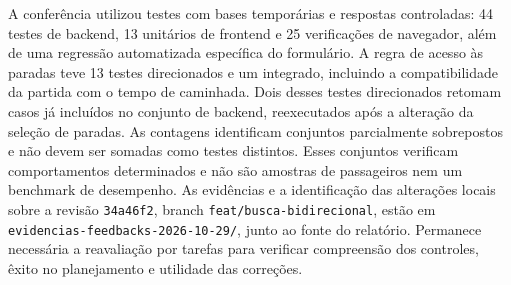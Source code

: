 A conferência utilizou testes com bases temporárias e respostas controladas: 44 testes de backend, 13 unitários de frontend e 25 verificações de navegador, além de uma regressão automatizada específica do formulário. A regra de acesso às paradas teve 13 testes direcionados e um integrado, incluindo a compatibilidade da partida com o tempo de caminhada. Dois desses testes direcionados retomam casos já incluídos no conjunto de backend, reexecutados após a alteração da seleção de paradas. As contagens identificam conjuntos parcialmente sobrepostos e não devem ser somadas como testes distintos. Esses conjuntos verificam comportamentos determinados e não são amostras de passageiros nem um benchmark de desempenho. As evidências e a identificação das alterações locais sobre a revisão \texttt{34a46f2}, branch \texttt{feat/busca-bidirecional}, estão em \nolinkurl{evidencias-feedbacks-2026-10-29/}, junto ao fonte do relatório. Permanece necessária a reavaliação por tarefas para verificar compreensão dos controles, êxito no planejamento e utilidade das correções.

